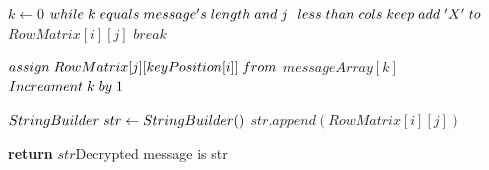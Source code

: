 \documentclass[twoside,twocolumn]{article}
\begin{document}
\begin{algorithm}
\begin{algorithmic}[1]
 
	  \State $k \gets 0$
        	   \State $while \hspace{0.1cm} k \hspace{0.1cm} equals \hspace{0.1cm} message's \hspace{0.1cm} length \hspace{0.1cm} and \hspace{0.1cm} j \hspace{0.1cm}   $
        	   \State $less \hspace{0.1cm}than \hspace{0.1cm} cols \hspace{0.1cm} keep \hspace{0.1cm}add \hspace{0.1cm}'X' \hspace{0.1cm} to \hspace{0.1cm}$
        	   \State $RowMatrix[i][j]$
        	   \State $break$
        	  
        	   \State $assign \hspace{0.1cm}  RowMatrix[j][keyPosition[i]] \hspace{0.1cm}  from$
        	   \State $messageArray[k]$
        	   \State \footnotesize $Increament\hspace{0.1cm} k\hspace{0.1cm} by \hspace{0.1cm}1$	
        	   \State \footnotesize$ $
		    \EndIf
        \EndFor  
      \EndFor  
               
      \State \footnotesize $ StringBuilder\hspace{0.1cm} str \gets StringBuilder()$
	  		\State $ str.append(RowMatrix[i][j]) $
		    \EndIf
        \EndFor  
      \EndFor  
      
      \State \textbf{return} $str$\Comment \tiny{Decrypted message is str}
    \EndFunction
  \end{algorithmic}
\end{algorithm}
\end{document}
